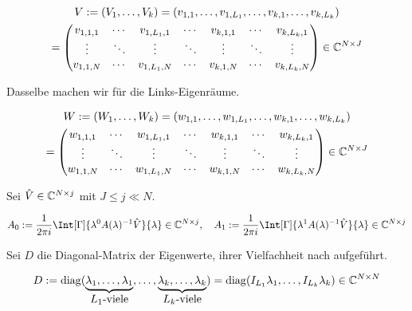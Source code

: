 \begin{multline*}
    V
    :=
    (V_1, \dots, V_k)
    =
    (v_{1, 1}, \dots, v_{1, L_1}, \dots, v_{k, 1}, \dots, v_{k, L_k}) \\
    =
    \begin{pmatrix}
        v_{1, 1, 1} & \cdots & v_{1, L_1, 1} & \cdots & v_{k, 1, 1} & \cdots & v_{k, L_k, 1} \\
        \vdots      & \ddots & \vdots        & \ddots & \vdots      & \ddots & \vdots        \\
        v_{1, 1, N} & \cdots & v_{1, L_1, N} & \cdots & v_{k, 1, N} & \cdots & v_{k, L_k, N}
    \end{pmatrix}
    \in
    \mathbb{C}^{N \times J}
\end{multline*}

Dasselbe machen wir für die Links-Eigenräume.

\begin{multline*}
    W
    :=
    (W_1, \dots, W_k)
    =
    (w_{1, 1}, \dots, w_{1, L_1}, \dots, w_{k, 1}, \dots, w_{k, L_k}) \\
    =
    \begin{pmatrix}
        w_{1, 1, 1} & \cdots & w_{1, L_1, 1} & \cdots & w_{k, 1, 1} & \cdots & w_{k, L_k, 1} \\
        \vdots      & \ddots & \vdots        & \ddots & \vdots      & \ddots & \vdots        \\
        w_{1, 1, N} & \cdots & w_{1, L_1, N} & \cdots & w_{k, 1, N} & \cdots & w_{k, L_k, N}
    \end{pmatrix}
    \in
    \mathbb{C}^{N \times J}
\end{multline*}

Sei $\hat V \in \mathbb{C}^{N \times j}$ mit $J \leq j \ll N$.

\begin{align} \label{eq:integral_matrizen}
    A_0 := \frac{1}{2 \pi i} \Int[\Gamma]{\lambda^0 A(\lambda)^{-1} \hat V}{\lambda} \in \C^{N \times j},
    \quad
    A_1 := \frac{1}{2 \pi i} \Int[\Gamma]{\lambda^1 A(\lambda)^{-1} \hat V}{\lambda} \in \C^{N \times j}
\end{align}

Sei $D$ die Diagonal-Matrix der Eigenwerte, ihrer Vielfachheit nach aufgeführt.

\begin{align} \label{eq:diagonal_matrix}
    D
    :=
    \operatorname{diag}
    (
        \underbrace
        {
            \lambda_1, \dots, \lambda_1
        }_{
            \displaystyle
            \text{$L_1$-viele}
        },
        \dots,
        \underbrace
        {
            \lambda_k, \dots, \lambda_k
        }_{
            \displaystyle
            \text{$L_k$-viele}
        }
    )
    =
    \operatorname{diag}(I_{L_1} \lambda_1, \dots, I_{L_k} \lambda_k)
    \in
    \mathbb{C}^{N \times N}
\end{align}

